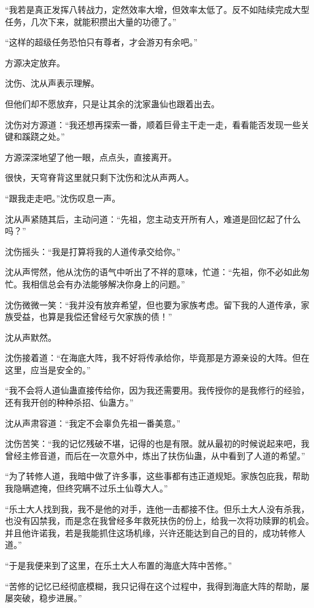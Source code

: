 \begin{this_body}
“我若是真正发挥八转战力，定然效率大增，但效率太低了。反不如陆续完成大型任务，几次下来，就能积攒出大量的功德了。”

“这样的超级任务恐怕只有尊者，才会游刃有余吧。”

方源决定放弃。

沈伤、沈从声表示理解。

但他们却不愿放弃，只是让其余的沈家蛊仙也跟着出去。

沈伤对方源道：“我还想再探索一番，顺着巨骨主干走一走，看看能否发现一些关键和蹊跷之处。”

方源深深地望了他一眼，点点头，直接离开。

很快，天穹脊背这里就只剩下沈伤和沈从声两人。

“跟我走走吧。”沈伤叹息一声。

沈从声紧随其后，主动问道：“先祖，您主动支开所有人，难道是回忆起了什么吗？”

沈伤摇头：“我是打算将我的人道传承交给你。”

沈从声愕然，他从沈伤的语气中听出了不祥的意味，忙道：“先祖，你不必如此匆忙。我相信总会有办法能够解决你身上的问题。”

沈伤微微一笑：“我并没有放弃希望，但也要为家族考虑。留下我的人道传承，家族受益，也算是我偿还曾经亏欠家族的债！”

沈从声默然。

沈伤接着道：“在海底大阵，我不好将传承给你，毕竟那是方源亲设的大阵。但在这里，应当是安全的。”

“我不会将人道仙蛊直接传给你，因为我还需要用。我传授你的是我修行的经验，还有我开创的种种杀招、仙蛊方。”

沈从声肃容道：“我定不会辜负先祖一番美意。”

沈伤苦笑：“我的记忆残破不堪，记得的也是有限。就从最初的时候说起来吧，我曾经主修音道，而后在一次意外中，炼出了扶伤仙蛊，从中看到了人道的希望。”

“为了转修人道，我暗中做了许多事，这些事都有违正道规矩。家族包庇我，帮助我隐瞒遮掩，但终究瞒不过乐土仙尊大人。”

“乐土大人找到我，我不是他的对手，连他一击都接不住。但乐土大人没有杀我，也没有囚禁我，而是念在我曾经多年救死扶伤的份上，给我一次将功赎罪的机会。并且他许诺我，若是我能抓住这场机缘，兴许还能达到自己的目的，成功转修人道。”

“于是我便来到了这里，在乐土大人布置的海底大阵中苦修。”

“苦修的记忆已经彻底模糊，我只记得在这个过程中，我得到海底大阵的帮助，屡屡突破，稳步进展。”


\end{this_body}
